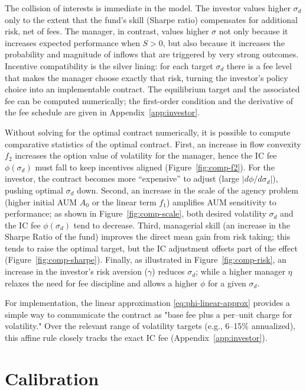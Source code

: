 \documentclass[11pt]{article}
\newcommand{\Sharpe}{S}
\begin{document}
The collision of interests is immediate in the model. The investor values higher $\sigma_d$ only to the extent that the fund’s skill (Sharpe ratio) compensates for additional risk, net of fees. The manager, in contrast, values higher $\sigma$ not only because it increases expected performance when $\Sharpe>0$, but also because it increases the probability and magnitude of inflows that are triggered by very strong outcomes. Incentive compatibility is the silver lining: for each target $\sigma_d$ there is a fee level that makes the manager choose exactly that risk, turning the investor’s policy choice into an implementable contract. The equilibrium target and the associated fee can be computed numerically; the first-order condition and the derivative of the fee schedule are given in Appendix~\ref{app:investor}.

Without solving for the optimal contract numerically, it is possible to compute comparative statistics of the optimal contract. First, an increase in flow convexity $f_2$ increases the option value of volatility for the manager, hence the IC fee \(\phi(\sigma_d)\) must fall to keep incentives aligned (Figure~\ref{fig:comp-f2}). For the investor, the contract becomes more “expensive” to adjust (large \(|d\phi/d\sigma_d|\)), pushing optimal \(\sigma_d\) down.
Second, an increase in the scale of the agency problem (higher initial AUM $A_0$ or the linear term $f_1$) amplifies AUM sensitivity to performance; as shown in Figure~\ref{fig:comp-scale}, both desired volatility \(\sigma_d\) and the IC fee \(\phi(\sigma_d)\) tend to decrease.
Third, managerial skill (an increase in the Sharpe Ratio of the fund) improves the direct mean gain from risk taking; this tends to raise the optimal target, but the IC adjustment offsets part of the effect (Figure~\ref{fig:comp-sharpe}).
Finally, as illustrated in Figure~\ref{fig:comp-risk}, an increase in the investor's risk aversion ($\gamma$) reduces \(\sigma_d\); while a higher manager \(\eta\) relaxes the need for fee discipline and allows a higher \(\phi\) for a given \(\sigma_d\).


For implementation, the linear approximation \eqref{eq:phi-linear-approx} provides a simple way to communicate the contract as "base fee plus a per–unit charge for volatility." Over the relevant range of volatility targets (e.g., 6–15\% annualized), this affine rule closely tracks the exact IC fee (Appendix~\ref{app:investor}).



\section{Calibration}
\label{sec:calibration}
\end{document}
